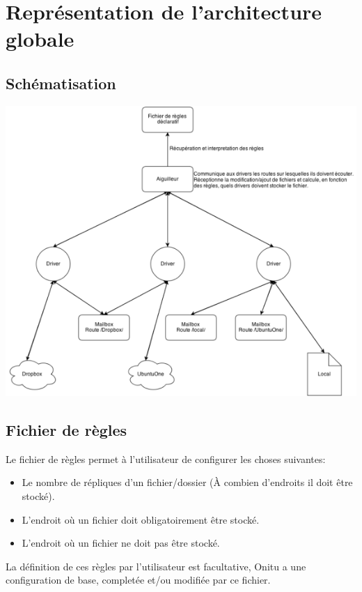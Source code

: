\chapter{Représentation de l’architecture globale}
\thispagestyle{EIP}

\section{Schématisation}
\includegraphics{schema_architecture_globale.png} 

\newpage
\section{Fichier de règles}

Le fichier de règles permet à l'utilisateur de configurer les choses suivantes:
\newline

\begin{itemize}
\itemsep1pt\parskip0pt
\item
  Le nombre de répliques d'un fichier/dossier (À combien d'endroits il doit être stocké).
\item
  L'endroit où un fichier doit obligatoirement être stocké.
\item
  L'endroit où un fichier ne doit pas être stocké.
\newline
\end{itemize}

La définition de ces règles par l'utilisateur est facultative, Onitu a une configuration de base, completée et/ou modifiée par ce fichier.


